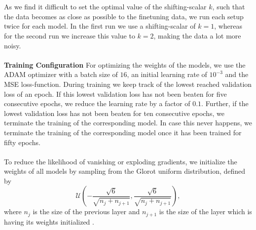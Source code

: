 \documentclass[./main.tex]{subfiles}
\begin{document}
\\
\\
As we find it difficult to set the optimal value of the shifting-scalar $k$, such that the data becomes as close as possible to the finetuning data, we run each setup twice for each model. In the first run we use a shifting-scalar of $k = 1$, whereas for the second run we increase this value to $k = 2$, making the data a lot more noisy.
\\
\\
\textbf{Training Configuration} For optimizing the weights of the models, we use the ADAM optimizer with a batch size of $16$, an initial learning rate of $10^{-3}$ and the MSE loss-function. During training we keep track of the lowest reached validation loss of an epoch. If this lowest validation loss has not been beaten for five consecutive epochs, we reduce the learning rate by a factor of $0.1$. Further, if the lowest validation loss has not been beaten for ten consecutive epochs, we terminate the training of the corresponding model. In case this never happens, we terminate the training of the corresponding model once it has been trained for fifty epochs.
\\
\\
To reduce the likelihood of vanishing or exploding gradients, we initialize the weights of all models by sampling from the Glorot uniform distribution, defined by
\begin{equation}
    \mathcal{U} \left(- \frac{\sqrt{6}}{\sqrt{n_j + n_{j + 1}}}, \frac{\sqrt{6}}{\sqrt{n_j + n_{j + 1}}} \right),
\end{equation}
where $n_j$ is the size of the previous layer and $n_{j + 1}$ is the size of the layer which is having its weights initialized \cite{glorot2010understanding}.
\end{document}
